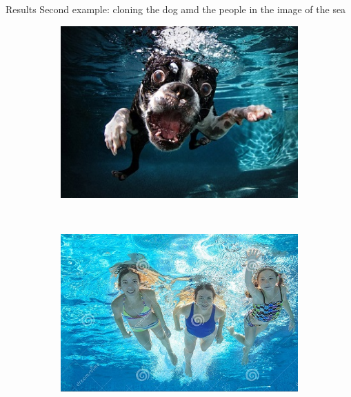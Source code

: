 \documentclass[11pt]{beamer}
\begin{document}
\begin{frame}{Results}
Second example: cloning the dog amd the people in the image of the sea
\begin{figure}
    \centering
    \begin{subfigure}[b]{0.36\textwidth}
        \includegraphics[width=\textwidth]{dog}

    \end{subfigure}
    ~ 
        \begin{subfigure}[b]{0.4\textwidth}
        \includegraphics[width=\textwidth]{family_original}

    \end{subfigure}
    

\end{figure}
\end{frame}
\end{document}
